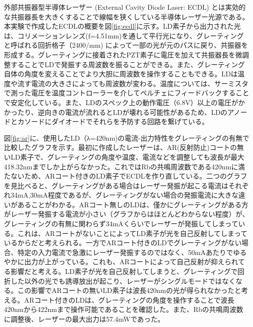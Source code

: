 \documentclass[dvipdfmx]{jsarticle}
\begin{document}
外部共振器型半導体レーザー (External Cavity Diode Laser: ECDL) とは実効的な共振器長を大きくすることで線幅を狭くしている半導体レーザー光源である。\cite{suzuki}本実験で作成したECDLの概要を図\ref{fig:ecdl}に示す。LD素子から出力された光は、コリメーションレンズ(f=4.51mm)を通して平行光になり、グレーティングと呼ばれる回折格子（2400/mm) によって一部の光が元のパスに戻り、共振器を形成する。グレーティングに接着されたPZT素子に電圧を加えて共振器長を微調整することでLDで発振する周波数を振ることができる。また、グレーティング自体の角度を変えることでより大胆に周波数を操作することもできる。LDは温度や流す電流の大きさによっても周波数が変わる。温度については、サーミスタで測った電圧を温度コントローラーを介してペルチェにフィードバックすることで安定化している。また、LDのスペック上の動作電圧（6.8V）以上の電圧がかかったり、逆向きの電流が流れるとLDが壊れる可能性があるため、LDのアノードとカソードにダイオードでそれらを予防する回路を繋げている。
 
図\ref{fig:ar}に、使用したLD（λ=420nm)の電流-出力特性をグレーティングの有無で比較したグラフを示す。最初に作成したレーザーは、AR(反射防止)コートの無いLD素子で、グレーティングの角度や温度、電流などを調整しても波長が最大418.32nmまでしか上がらなかった。これではRbの共鳴周波数である420nmに満たないため、ARコート付きのLD素子でECDLを作り直している。二つのグラフを見比べると、グレーティングがある場合はレーザー発振が起こる電流はそれぞれ34mA,30mA程度であるが、グレーティングがない場合の発振電流に大きな違いがあることがわかる。ARコート無しのLDは、僅かにグレーティングがある方がレーザー発振する電流が小さい（グラフからはほとんどわからない程度）が、グレーティングの有無に関わらず34mAくらいでレーザーが発振してしまっている。これは、ARコートがないことによってLD素子が光を自己反射してしまっているからだと考えられる。一方でARコート付きのLDでグレーティングがない場合、特定の入力電流で急激にレーザー発振するのではなく、50mAあたりでゆるやかに出力が上がっている。これも、ARコートによって自己反射が抑えられてる影響だと考える。LD素子が光を自己反射してしまうと、グレーティングで回折した以外の光でも誘導放出が起こり、レーザーがシングルモードではなくなる。この影響でARコートの無いLD素子は波長420nmの光が得られなかったと考える。ARコート付きのLDは、グレーティングの角度を操作することで波長420nmから422nmまで操作可能であることを確認した。また、Rbの共鳴周波数に調整後、レーザーの最大出力は57.4mWであった。
\end{document}
